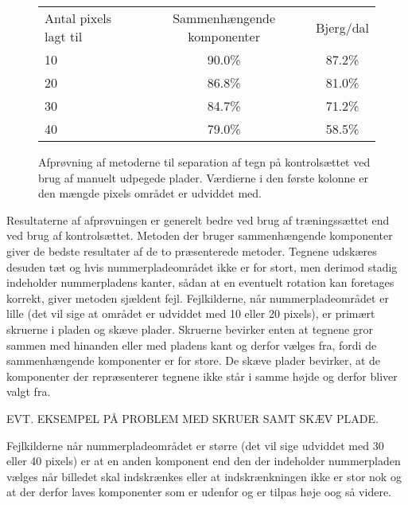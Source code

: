 \begin{figure}[htp]
\centering
\begin{tabular}{|l|c|c|}\hline
\rowcolor[gray]{0.9} \multicolumn{3}{|>{\columncolor[gray]{0.9}}c|}{\textbf{Separation af tegn - Kontrolsæt}} \\ \hline
Antal pixels lagt til & Sammenhængende komponenter & Bjerg/dal \\\hline
10 & 90.0\% & 87.2\% \\\hline
20 & 86.8\% & 81.0\% \\\hline
30 & 84.7\% & 71.2\% \\\hline
40 & 79.0\% & 58.5\% \\\hline \end{tabular}
\caption{Afprøvning af metoderne til separation af tegn på kontrolsættet ved brug af manuelt udpegede plader. Værdierne i den første kolonne er den mængde pixels området er udviddet med.}
\label{fig:test:sep-kontrol-manuel}
\end{figure}


Resultaterne af afprøvningen er generelt bedre ved brug af træningssættet end ved brug af kontrolsættet. Metoden der bruger sammenhængende komponenter giver de bedste resultater af de to præsenterede metoder. Tegnene udskæres desuden tæt og hvis nummerpladeområdet ikke er for stort, men derimod stadig indeholder nummerpladens kanter, sådan at en eventuelt rotation kan foretages korrekt, giver metoden sjældent fejl. Fejlkilderne, når nummerpladeområdet er lille (det vil sige at området er udviddet med 10 eller 20 pixels), er primært skruerne i pladen og skæve plader. Skruerne bevirker enten at tegnene gror sammen med hinanden eller med pladens kant og derfor vælges fra, fordi de sammenhængende komponenter er for store. De skæve plader bevirker, at de komponenter der repræsenterer tegnene ikke står i samme højde og derfor bliver valgt fra.

EVT. EKSEMPEL PÅ PROBLEM MED SKRUER SAMT SKÆV PLADE.

Fejlkilderne når nummerpladeområdet er større (det vil sige udviddet med 30 eller 40 pixels) er at en anden komponent end den der indeholder nummerpladen vælges når billedet skal indskrænkes eller at indskrænkningen ikke er stor nok og at der derfor laves komponenter som er udenfor og er tilpas høje oog så videre.

